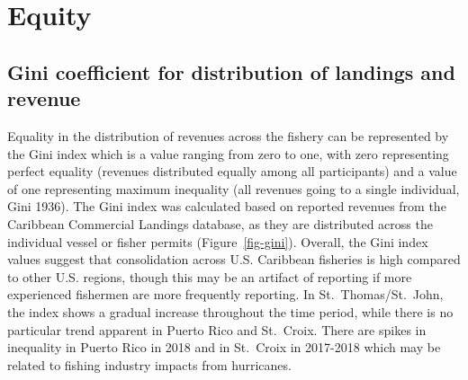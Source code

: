 \documentclass[
  letterpaper,
  oneside,
  open=any]{scrbook}
\begin{document}
\section{Equity}\label{equity}

\subsection{Gini coefficient for distribution of landings and
revenue}\label{gini-coefficient-for-distribution-of-landings-and-revenue}

Equality in the distribution of revenues across the fishery can be
represented by the Gini index which is a value ranging from zero to one,
with zero representing perfect equality (revenues distributed equally
among all participants) and a value of one representing maximum
inequality (all revenues going to a single individual, Gini 1936). The
Gini index was calculated based on reported revenues from the Caribbean
Commercial Landings database, as they are distributed across the
individual vessel or fisher permits (Figure~\ref{fig-gini}). Overall,
the Gini index values suggest that consolidation across U.S. Caribbean
fisheries is high compared to other U.S. regions, though this may be an
artifact of reporting if more experienced fishermen are more frequently
reporting. In St.~Thomas/St.~John, the index shows a gradual increase
throughout the time period, while there is no particular trend apparent
in Puerto Rico and St.~Croix. There are spikes in inequality in Puerto
Rico in 2018 and in St.~Croix in 2017-2018 which may be related to
fishing industry impacts from hurricanes.
\end{document}
